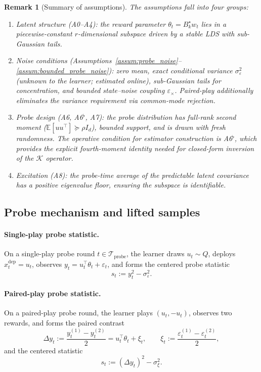 \documentclass[12pt]{article}
\newcommand{\E}{\mathbb{E}}
\newcommand{\cTprobe}{\mathcal{T}_{\mathrm{probe}}}
\newtheorem{remark}{Remark}
\theoremstyle{plain}
\theoremstyle{definition}
\begin{document}
\begin{remark}[Summary of assumptions]
\label{rem:assumption_summary}
The assumptions fall into four groups:
\begin{enumerate}[nosep,leftmargin=1.5em]
\item \emph{Latent structure} (A0--A4): the reward parameter $\theta_t = B_k^\star w_t$ lies in a piecewise-constant $r$-dimensional subspace driven by a stable LDS with sub-Gaussian tails.
\item \emph{Noise conditions} (Assumptions~\ref{assum:probe_noise}--\ref{assum:bounded_probe_noise}): zero mean, exact conditional variance $\sigma_\varepsilon^2$ (unknown to the learner; estimated online), sub-Gaussian tails for concentration, and bounded state--noise coupling $\varepsilon_\times$.
Paired-play additionally eliminates the variance requirement via common-mode rejection.
\item \emph{Probe design} (A6, A6$^\flat$, A7): the probe distribution has full-rank second moment ($\E[uu^\top] \succeq \rho I_d$), bounded support, and is drawn with fresh randomness. The operative condition for estimator construction is A6$^\flat$, which provides the explicit fourth-moment identity needed for closed-form inversion of the $\mathcal{K}$ operator.
\item \emph{Excitation} (A8): the probe-time average of the predictable latent covariance has a positive eigenvalue floor, ensuring the subspace is identifiable.
\end{enumerate}
\end{remark}

\subsection{Probe mechanism and lifted samples}

\paragraph{Single-play probe statistic.} On a single-play probe round $t \in \cTprobe$, the learner draws $u_t \sim Q$, deploys $x_t^{\mathrm{dep}} = u_t$, observes $y_t = u_t^\top \theta_t + \varepsilon_t$, and forms the centered probe statistic
\begin{equation}
s_t := y_t^2 - \sigma_\varepsilon^2.
\label{eq:single_play_statistic}
\end{equation}

\paragraph{Paired-play probe statistic.} On a paired-play probe round, the learner plays $(u_t, -u_t)$, observes two rewards, and forms the paired contrast
\[
\Delta y_t := \frac{y_t^{(1)} - y_t^{(2)}}{2} = u_t^\top \theta_t + \xi_t,
\qquad
\xi_t := \frac{\varepsilon_t^{(1)} - \varepsilon_t^{(2)}}{2},
\]
and the centered statistic
\begin{equation}
s_t := (\Delta y_t)^2 - \sigma_\xi^2.
\label{eq:paired_play_statistic}
\end{equation}
\end{document}
